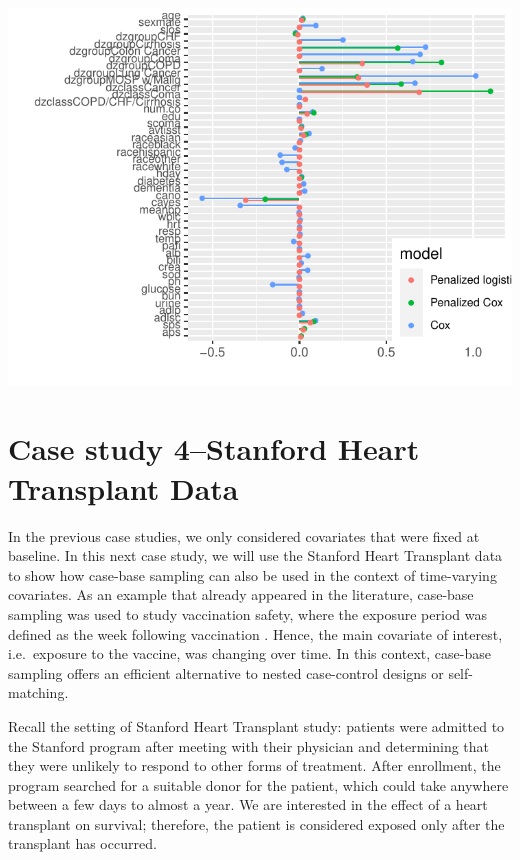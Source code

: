 \documentclass[
]{jss}
\begin{document}
\begin{CodeChunk}


\begin{center}\includegraphics{../figures/coefplots-1} \end{center}

\end{CodeChunk}

\hypertarget{case-study-4stanford-heart-transplant-data}{%
\section{Case study 4--Stanford Heart Transplant
Data}\label{case-study-4stanford-heart-transplant-data}}

In the previous case studies, we only considered covariates that were
fixed at baseline. In this next case study, we will use the Stanford
Heart Transplant data
\citep[\citet{crowley1977covariance}]{clark1971cardiac} to show how
case-base sampling can also be used in the context of time-varying
covariates. As an example that already appeared in the literature,
case-base sampling was used to study vaccination safety, where the
exposure period was defined as the week following vaccination
\citep{saarela2015case}. Hence, the main covariate of interest,
i.e.~exposure to the vaccine, was changing over time. In this context,
case-base sampling offers an efficient alternative to nested
case-control designs or self-matching.

Recall the setting of Stanford Heart Transplant study: patients were
admitted to the Stanford program after meeting with their physician and
determining that they were unlikely to respond to other forms of
treatment. After enrollment, the program searched for a suitable donor
for the patient, which could take anywhere between a few days to almost
a year. We are interested in the effect of a heart transplant on
survival; therefore, the patient is considered exposed only after the
transplant has occurred.
\end{document}
